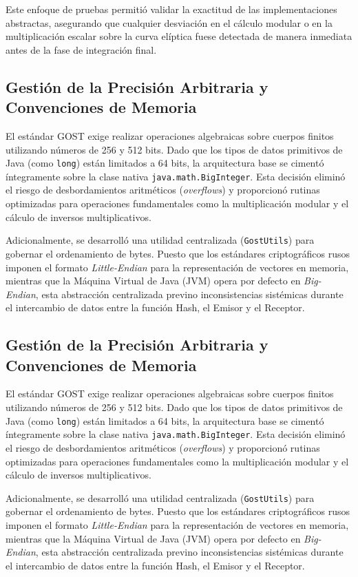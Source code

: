 Este enfoque de pruebas permitió validar la exactitud de las implementaciones abstractas, asegurando que cualquier desviación en el cálculo modular o en la multiplicación escalar sobre la curva elíptica fuese detectada de manera inmediata antes de la fase de integración final.

\subsection{Gestión de la Precisión Arbitraria y Convenciones de Memoria}
El estándar GOST exige realizar operaciones algebraicas sobre cuerpos finitos utilizando números de 256 y 512 bits. Dado que los tipos de datos primitivos de Java (como \texttt{long}) están limitados a 64 bits, la arquitectura base se cimentó íntegramente sobre la clase nativa \texttt{java.math.BigInteger}. Esta decisión eliminó el riesgo de desbordamientos aritméticos (\textit{overflows}) y proporcionó rutinas optimizadas para operaciones fundamentales como la multiplicación modular y el cálculo de inversos multiplicativos.

Adicionalmente, se desarrolló una utilidad centralizada (\texttt{GostUtils}) para gobernar el ordenamiento de bytes. Puesto que los estándares criptográficos rusos imponen el formato \textit{Little-Endian} para la representación de vectores en memoria, mientras que la Máquina Virtual de Java (JVM) opera por defecto en \textit{Big-Endian}, esta abstracción centralizada previno inconsistencias sistémicas durante el intercambio de datos entre la función Hash, el Emisor y el Receptor.

\subsection{Gestión de la Precisión Arbitraria y Convenciones de Memoria}
El estándar GOST exige realizar operaciones algebraicas sobre cuerpos finitos utilizando números de 256 y 512 bits. Dado que los tipos de datos primitivos de Java (como \texttt{long}) están limitados a 64 bits, la arquitectura base se cimentó íntegramente sobre la clase nativa \texttt{java.math.BigInteger}. Esta decisión eliminó el riesgo de desbordamientos aritméticos (\textit{overflows}) y proporcionó rutinas optimizadas para operaciones fundamentales como la multiplicación modular y el cálculo de inversos multiplicativos.

Adicionalmente, se desarrolló una utilidad centralizada (\texttt{GostUtils}) para gobernar el ordenamiento de bytes. Puesto que los estándares criptográficos rusos imponen el formato \textit{Little-Endian} para la representación de vectores en memoria, mientras que la Máquina Virtual de Java (JVM) opera por defecto en \textit{Big-Endian}, esta abstracción centralizada previno inconsistencias sistémicas durante el intercambio de datos entre la función Hash, el Emisor y el Receptor.